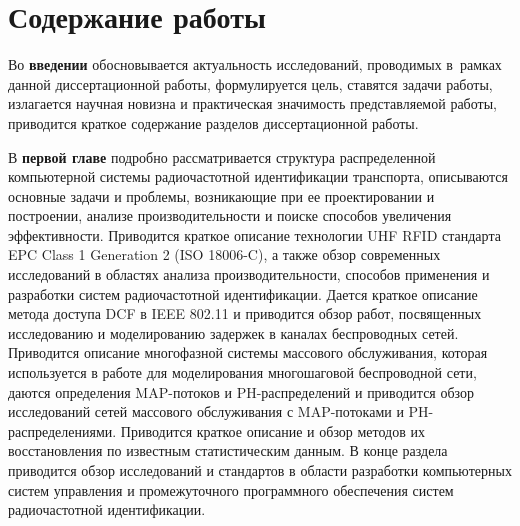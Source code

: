 

\section*{Содержание работы}
Во \textbf{введении} обосновывается актуальность исследований, проводимых в~рамках данной диссертационной работы, формулируется цель, ставятся задачи работы, излагается научная новизна и практическая значимость представляемой работы, приводится краткое содержание разделов диссертационной работы.


В \textbf{первой главе} подробно рассматривается структура распределенной компьютерной системы радиочастотной идентификации транспорта, описываются основные задачи и проблемы, возникающие при ее проектировании и построении, анализе производительности и поиске способов увеличения эффективности. Приводится краткое описание технологии UHF RFID стандарта EPC Class 1 Generation 2 (ISO 18006-C), а также обзор современных исследований в областях анализа производительности, способов применения и разработки систем радиочастотной идентификации. Дается краткое описание метода доступа DCF в IEEE 802.11 и приводится обзор работ, посвященных исследованию и моделированию задержек в каналах беспроводных сетей. Приводится описание многофазной системы массового обслуживания, которая используется в работе для моделирования многошаговой беспроводной сети, даются определения MAP-потоков и PH-распределений и приводится обзор исследований сетей массового обслуживания с MAP-потоками и PH-распределениями. Приводится краткое описание и обзор методов их восстановления по известным статистическим данным. В конце раздела приводится обзор исследований и стандартов в области разработки компьютерных систем управления и промежуточного программного обеспечения систем радиочастотной идентификации.


